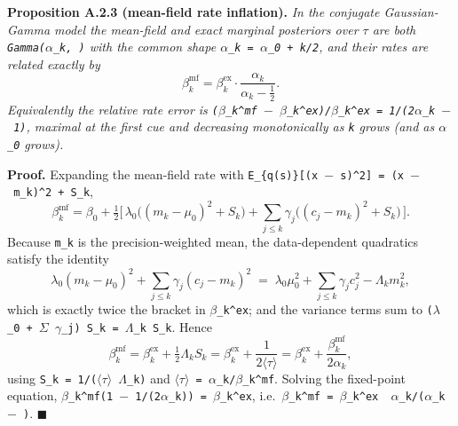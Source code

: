 \documentclass{article}
\begin{document}
\textbf{Proposition A.2.3 (mean-field rate inflation).} \emph{In the
conjugate Gaussian-Gamma model the mean-field and exact marginal
posteriors over \texttt{\ensuremath{\tau}} are both \texttt{Gamma(\ensuremath{\alpha}\_k,\ \textperiodcentered{})} with the
common shape \texttt{\ensuremath{\alpha}\_k\ =\ \ensuremath{\alpha}\_0\textquotesingle{}\ +\ k/2}, and their
rates are related exactly by} \[
\beta_k^{\mathrm{mf}} = \beta_k^{\mathrm{ex}} \cdot \frac{\alpha_k}{\alpha_k - \tfrac12}.
\] \emph{Equivalently the relative rate error is
\texttt{(\ensuremath{\beta}\_k\^{}mf\ \ensuremath{-}\ \ensuremath{\beta}\_k\^{}ex)/\ensuremath{\beta}\_k\^{}ex\ =\ 1/(2\ensuremath{\alpha}\_k\ \ensuremath{-}\ 1)},
maximal at the first cue and decreasing monotonically as \texttt{k}
grows (and as \texttt{\ensuremath{\alpha}\_0} grows).}

\textbf{Proof.} Expanding the mean-field rate with
\texttt{E\_\{q(s)\}{[}(x\ \ensuremath{-}\ s)\^{}2{]}\ =\ (x\ \ensuremath{-}\ m\_k)\^{}2\ +\ S\_k},
\[
\beta_k^{\mathrm{mf}} = \beta_0 + \tfrac12\big[\, \lambda_0\big((m_k-\mu_0)^2 + S_k\big) + \textstyle\sum_{j\le k} \gamma_j\big((c_j - m_k)^2 + S_k\big) \,\big].
\] Because \texttt{m\_k} is the precision-weighted mean, the
data-dependent quadratics satisfy the identity \[
\lambda_0 (m_k-\mu_0)^2 + \textstyle\sum_{j\le k} \gamma_j (c_j - m_k)^2 \;=\; \lambda_0 \mu_0^2 + \textstyle\sum_{j\le k} \gamma_j c_j^2 - \Lambda_k m_k^2,
\] which is exactly twice the bracket in \texttt{\ensuremath{\beta}\_k\^{}ex}; and the
variance terms sum to \texttt{(\ensuremath{\lambda}\_0\ +\ \ensuremath{\Sigma}\ \ensuremath{\gamma}\_j)\ S\_k\ =\ \ensuremath{\Lambda}\_k\ S\_k}.
Hence \[
\beta_k^{\mathrm{mf}} = \beta_k^{\mathrm{ex}} + \tfrac12 \Lambda_k S_k = \beta_k^{\mathrm{ex}} + \frac{1}{2\langle\tau\rangle} = \beta_k^{\mathrm{ex}} + \frac{\beta_k^{\mathrm{mf}}}{2\alpha_k},
\] using \texttt{S\_k\ =\ 1/(\ensuremath{\langle}\ensuremath{\tau}\ensuremath{\rangle}\ \ensuremath{\Lambda}\_k)} and
\texttt{\ensuremath{\langle}\ensuremath{\tau}\ensuremath{\rangle}\ =\ \ensuremath{\alpha}\_k/\ensuremath{\beta}\_k\^{}mf}. Solving the fixed-point equation,
\texttt{\ensuremath{\beta}\_k\^{}mf(1\ \ensuremath{-}\ 1/(2\ensuremath{\alpha}\_k))\ =\ \ensuremath{\beta}\_k\^{}ex},
i.e.~\texttt{\ensuremath{\beta}\_k\^{}mf\ =\ \ensuremath{\beta}\_k\^{}ex\ \textperiodcentered{}\ \ensuremath{\alpha}\_k/(\ensuremath{\alpha}\_k\ \ensuremath{-}\ \textonehalf{})}. \ensuremath{\blacksquare}
\end{document}
